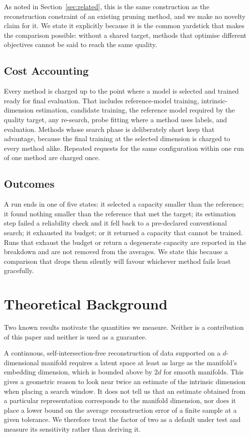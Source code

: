 \documentclass[make,article,submit,pdftex,moreauthors]{Definitions/mdpi}
\begin{document}
As noted in Section~\ref{sec:related}, this is the same construction as
the reconstruction constraint of an existing pruning method, and we make
no novelty claim for it. We state it explicitly because it is the common
yardstick that makes the comparison possible: without a shared target,
methods that optimise different objectives cannot be said to reach the
same quality.

\subsection{Cost Accounting}\label{sec:framework_cost}

Every method is charged up to the point where a model is selected and
trained ready for final evaluation. That includes reference-model
training, intrinsic-dimension estimation, candidate training, the
reference model required by the quality target, any re-search, probe
fitting where a method uses labels, and evaluation. Methods whose search
phase is deliberately short keep that advantage, because the final
training at the selected dimension is charged to every method alike.
Repeated requests for the same configuration within one run of one method
are charged once.

\subsection{Outcomes}\label{sec:framework_outcomes}

A run ends in one of five states: it selected a capacity smaller than the
reference; it found nothing smaller than the reference that met the
target; its estimation step failed a reliability check and it fell back to
a pre-declared conventional search; it exhausted its budget; or it
returned a capacity that cannot be trained. Runs that exhaust the budget
or return a degenerate capacity are reported in the breakdown and are not
removed from the averages. We state this because a comparison that drops
them silently will favour whichever method fails least gracefully.

\section{Theoretical Background}\label{sec:theory}

Two known results motivate the quantities we measure. Neither is a
contribution of this paper and neither is used as a guarantee.

A continuous, self-intersection-free reconstruction of data supported on a
$d$-dimensional manifold requires a latent space at least as large as the
manifold's embedding dimension, which is bounded above by $2d$ for smooth
manifolds. This gives a geometric reason to look near twice an estimate of
the intrinsic dimension when placing a search window. It does not tell us
that an estimate obtained from a particular representation corresponds to
the manifold dimension, nor does it place a lower bound on the average
reconstruction error of a finite sample at a given tolerance. We therefore
treat the factor of two as a default under test and measure its
sensitivity rather than deriving it.
\end{document}
